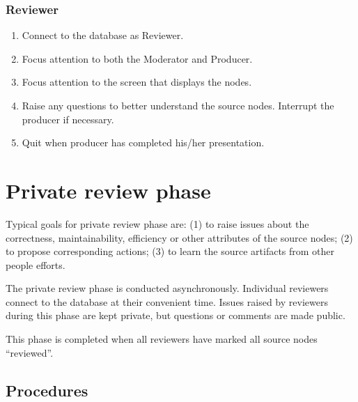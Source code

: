 \subsubsection*{Reviewer}
\begin{enumerate}
\item Connect to the database as Reviewer.
\item Focus attention to both the Moderator and Producer.
\item Focus attention to the screen that displays the nodes.
\item Raise any questions to better understand the source nodes.
Interrupt the producer if necessary.
\item Quit when producer has completed his/her presentation.
\end{enumerate}


\section {Private review phase}
Typical goals for private review phase are: 
(1) to raise issues about the correctness,
maintainability, efficiency or other attributes of the source nodes;
(2) to propose corresponding actions; (3) to learn the source
    artifacts from other people efforts.

The private review phase is conducted asynchronously. Individual
reviewers connect to the database at their convenient time. Issues
raised by reviewers during this phase are kept
private, but questions or comments are made public.

This phase is completed when all reviewers have marked all source
nodes ``reviewed''.

\subsection {Procedures}


